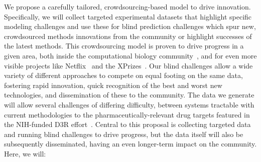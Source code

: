 \documentclass[11pt]{article}
\begin{document}
We propose a carefully tailored, crowdsourcing-based model to drive innovation. 
Specifically, we will collect targeted experimental datasets that highlight specific modeling challenges and use these for blind prediction challenges which spur new, crowdsourced methods innovations from the community or highlight successes of the latest methods.
This crowdsourcing model is proven to drive progress in a given area, both inside the computational biology community~\cite{Moult:2014:Proteins, Monastyrskyy:2016:Proteins, Moult:2016:Proteins, Prill:2011:Sci.Signal., Eisenstein:2013:NatBiotech, Saez-Rodriguez:2016:NatRevGenet}, and for even more visible projects like Netflix~\cite{Bell:2010:CHANCE} and the XPrizes~\cite{::XPRIZE, Kay:2011:R&DManage, XPrize:2017:Wikipedia}. 
Our blind challenges allow a wide variety of different approaches to compete on equal footing on the same data, fostering rapid innovation, quick recognition of the best and worst new technologies, and dissemination of these to the community. 
The data we generate will allow several challenges of differing difficulty, between systems tractable with current methodologies to the pharmaceutically-relevant drug targets featured in the NIH-funded D3R effort~\cite{Gathiaka:2016:JComputAidedMolDes}.
Central to this proposal is collecting targeted data and running blind challenges to drive progress, but the data itself will also be subsequently disseminated, having an even longer-term impact on the community.
Here, we will:

\end{document}
